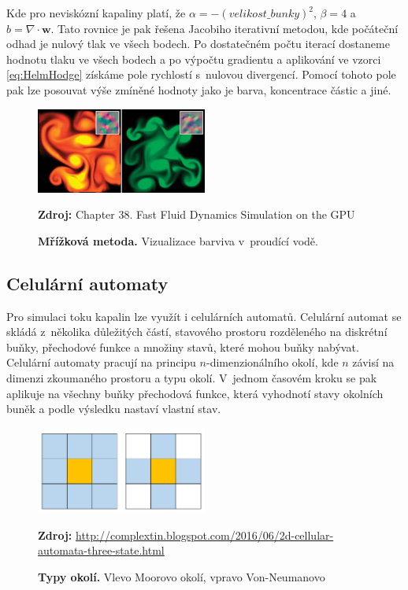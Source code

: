 Kde pro neviskózní kapaliny platí, že $\alpha = -( velikost\_bunky )^2$, $\beta = 4$ a $b = \nabla \cdot \mathbf{w}$. Tato rovnice je pak řešena Jacobiho iterativní metodou, kde počáteční odhad je nulový tlak ve všech bodech. Po dostatečném počtu iterací dostaneme hodnotu tlaku ve všech bodech a po výpočtu gradientu a aplikování ve vzorci \ref{eq:HelmHodge} získáme pole rychlostí s~nulovou divergencí. Pomocí tohoto pole pak lze posouvat výše zmíněné hodnoty jako je barva, koncentrace částic a jiné.
\cite{GPUGemsGridFLuid}

\begin{figure}[hbt]
	\centering
	\captionsetup{justification=centering}
	\includegraphics[width=0.5\textwidth]{obrazky-figures/GridFluid.jpg}
	\caption{\textbf{Mřížková metoda.} Vizualizace barviva v~proudící vodě.}
	\textbf{Zdroj: } Chapter 38. Fast Fluid Dynamics Simulation on the GPU \cite{GPUGemsGridFLuid}
	\label{fig:EulerFluid}
\end{figure}
 
\subsection{Celulární automaty}
Pro simulaci toku kapalin lze využít i celulárních automatů. Celulární automat se skládá z~několika důležitých částí, stavového prostoru rozděleného na diskrétní buňky, přechodové funkce a množiny stavů, které mohou buňky nabývat. Celulární automaty pracují na principu $n$-dimenzionálního okolí, kde $n$ závisí na dimenzi zkoumaného prostoru a typu okolí. V~jednom časovém kroku se pak aplikuje na všechny buňky přechodová funkce, která vyhodnotí stavy okolních buněk a podle výsledku nastaví vlastní stav. 

\begin{figure}[hbt]
	\centering
	\captionsetup{justification=centering}
	\includegraphics[width=0.5\textwidth]{obrazky-figures/Neighborhood.png}
	\caption{\textbf{Typy okolí.} Vlevo Moorovo okolí, vpravo Von-Neumanovo}
	\textbf{Zdroj: } \url{http://complextin.blogspot.com/2016/06/2d-cellular-automata-three-state.html}
	\label{fig:EulerFluid}
\end{figure}

